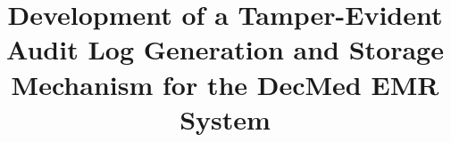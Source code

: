 \documentclass[conference,a4paper,english]{IEEEtran}
\begin{document}
\title{Development of a Tamper-Evident Audit Log Generation and Storage Mechanism for the DecMed EMR System
}



\maketitle













\printbibliography{}

\end{document}
